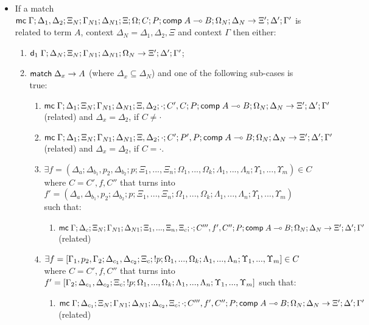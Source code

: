 \begin{theorem}
   \begin{itemize}
      \item If a match $\mathsf{mc} \; \Gamma; \Delta_1, \Delta_2; \Xi_N; \Gamma_{N1}; \Delta_{N1}; \Xi; \Omega; C; P; \mathsf{comp} \; A \multimap B; \Omega_N; \Delta_N \rightarrow \Xi'; \Delta'; \Gamma'$ is related to term $A$, context $\Delta_N = \Delta_1, \Delta_2, \Xi$ and context $\Gamma$ then either:
      \begin{enumerate}
         \item $\mathsf{d}_1 \; \Gamma; \Delta_N; \Xi_N; \Gamma_{N1}; \Delta_{N1}; \Omega_N \rightarrow \Xi'; \Delta'; \Gamma'$;
         \item $\mathsf{match} \; \Delta_x \rightarrow A$ (where $\Delta_x \subseteq \Delta_N$) and one of the following sub-cases is true:
         \begin{enumerate}
            \item $\mathsf{mc} \; \Gamma; \Delta_1; \Xi_N; \Gamma_{N1}; \Delta_{N1}; \Xi, \Delta_2; \cdot; C', C; P; \mathsf{comp} \; A \multimap B; \Omega_N; \Delta_N \rightarrow \Xi'; \Delta'; \Gamma'$ (related) and $\Delta_x = \Delta_2$, if $C \neq \cdot$
            \item $\mathsf{mc} \; \Gamma; \Delta_1; \Xi_N; \Gamma_{N1}; \Delta_{N1}; \Xi, \Delta_2; \cdot; C'; P', P; \mathsf{comp} \; A \multimap B; \Omega_N; \Delta_N \rightarrow \Xi'; \Delta'; \Gamma'$ (related) and $\Delta_x = \Delta_2$, if $C = \cdot$.
            \item $\exists f = (\Delta_a; \Delta_{b_1}, p_2, \Delta_{b_2}; p; \Xi_1, ..., \Xi_n; \Omega_1, ..., \Omega_k; \Lambda_1, ..., \Lambda_n; \Upsilon_1, ..., \Upsilon_m) \in C$ where $C = C', f, C''$ that turns into $f' = (\Delta_a, \Delta_{b_1}, p_2; \Delta_{b_2}; p; \Xi_1, ..., \Xi_n; \Omega_1, ..., \Omega_k; \Lambda_1, ..., \Lambda_n; \Upsilon_1, ..., \Upsilon_m)$ such that:
               \begin{enumerate}
                  \item $\mathsf{mc} \; \Gamma; \Delta_c; \Xi_N; \Gamma_{N1}; \Delta_{N1}; \Xi_1, ..., \Xi_n, \Xi_c; \cdot; C''', f', C''; P; \mathsf{comp} \; A \multimap B; \Omega_N; \Delta_N \rightarrow \Xi'; \Delta'; \Gamma'$ (related)
               \end{enumerate}
               
            \item $\exists f = [\Gamma_1, p_2, \Gamma_2; \Delta_{c_1}, \Delta_{c_2}; \Xi_c; {!} p; \Omega_1, ..., \Omega_k; \Lambda_1, ..., \Lambda_n; \Upsilon_1, ..., \Upsilon_m] \in C$ where $C = C', f, C''$ that turns into $f' = [\Gamma_2; \Delta_{c_1}, \Delta_{c_2}; \Xi_c; {!} p; \Omega_1, ..., \Omega_k; \Lambda_1, ..., \Lambda_n; \Upsilon_1, ..., \Upsilon_m]$ such that:
               \begin{enumerate}
                  \item $\mathsf{mc} \; \Gamma; \Delta_{c_1}; \Xi_N; \Gamma_{N1}; \Delta_{N1}; \Delta_{c_2}, \Xi_c; \cdot; C''', f', C''; P; \mathsf{comp} \; A \multimap B; \Omega_N; \Delta_N \rightarrow \Xi'; \Delta'; \Gamma'$ (related)
               \end{enumerate}
               

\end{enumerate}
\end{enumerate}
\end{itemize}
\end{theorem}
